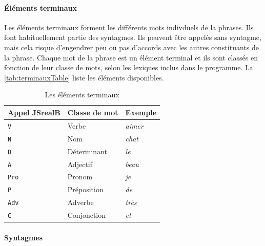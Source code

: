 \documentclass[11pt]{article} %
\newcommand{\system}[1]{\textsf{#1}}
\newcommand{\JSB}{\system{JSrealB}}
\newcommand{\real}[1]{\emph{#1}}
\begin{document}
\paragraph{Éléments terminaux}

Les éléments terminaux forment les différents mots indivduels de la phrases.
Ils font habituellement partie des syntagmes. Ils peuvent être
appelés sans syntagme, mais cela risque d'engendrer peu ou pas d'accords
avec les autres constituants de la phrase.
Chaque mot de la phrase est un élément terminal et ils sont classés
en fonction de leur classe de mots, selon les lexiques inclus dans le
programme. La \autoref{tab:terminauxTable} liste les éléments disponibles.

\begin{table}[ht]
\centering
\caption{Les éléments terminaux}
\label{tab:terminauxTable}
\begin{tabular}{|l|l|l|}
\hline 
\multicolumn{1}{|c}{Appel \JSB{}}  & \multicolumn{1}{|c}{Classe de mot} & \multicolumn{1}{|c|}{Exemple}\\
\hline 
\hline 
\texttt{V} & Verbe & \real{aimer}\\
\hline 
\texttt{N} & Nom & \real{chat}\\
\hline 
\texttt{D} & Déterminant & \real{le}\\
\hline 
\texttt{A} & Adjectif & \real{beau}\\
\hline 
\texttt{Pro} & Pronom & \real{je}\\
\hline 
\texttt{P} & Préposition & \real{de}\\
\hline 
\texttt{Adv} & Adverbe & \real{très}\\
\hline 
\texttt{C} & Conjonction & \real{et}\\
\hline 
\end{tabular}
\end{table}

\paragraph{Syntagmes}
\end{document}
